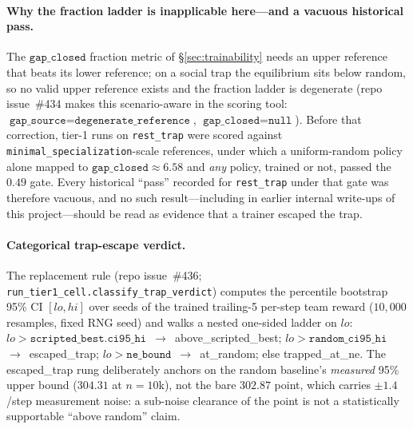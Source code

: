 \documentclass{anvil-paper}
\begin{document}
\paragraph{Why the fraction ladder is inapplicable here---and a vacuous
historical pass.}
The $\texttt{gap\_closed}$ fraction metric of \S\ref{sec:trainability}
needs an upper reference that beats its lower reference; on a social
trap the equilibrium sits below random, so no valid upper reference
exists and the fraction ladder is degenerate (repo issue~\#434 makes
this scenario-aware in the scoring tool:
$\texttt{gap\_source}{=}\texttt{degenerate\_reference}$,
$\texttt{gap\_closed}{=}\texttt{null}$). Before that correction, tier-1
runs on \texttt{rest\_trap} were scored against
\texttt{minimal\_specialization}-scale references, under which a
uniform-random policy alone mapped to $\texttt{gap\_closed}\approx 6.58$
and \emph{any} policy, trained or not, passed the $0.49$ gate. Every
historical ``pass'' recorded for \texttt{rest\_trap} under that gate was
therefore vacuous, and no such result---including in earlier internal
write-ups of this project---should be read as evidence that a trainer
escaped the trap.

\paragraph{Categorical trap-escape verdict.}
The replacement rule (repo issue~\#436;
\texttt{run\_tier1\_cell.classify\_trap\_verdict}) computes the
percentile bootstrap 95\% CI $[lo, hi]$ over seeds of the trained
trailing-5 per-step team reward ($10{,}000$ resamples, fixed RNG seed)
and walks a nested one-sided ladder on $lo$:
$lo > \texttt{scripted\_best.ci95\_hi}$~$\to$~\textsf{above\_scripted\_best};
$lo > \texttt{random\_ci95\_hi}$~$\to$~\textsf{escaped\_trap};
$lo > \texttt{ne\_bound}$~$\to$~\textsf{at\_random}; else
\textsf{trapped\_at\_ne}. The \textsf{escaped\_trap} rung deliberately
anchors on the random baseline's \emph{measured} 95\% upper bound
($304.31$ at $n{=}10$k), not the bare $302.87$ point, which carries
${\pm}1.4$/step measurement noise: a sub-noise clearance of the point is
not a statistically supportable ``above random'' claim.
\end{document}
